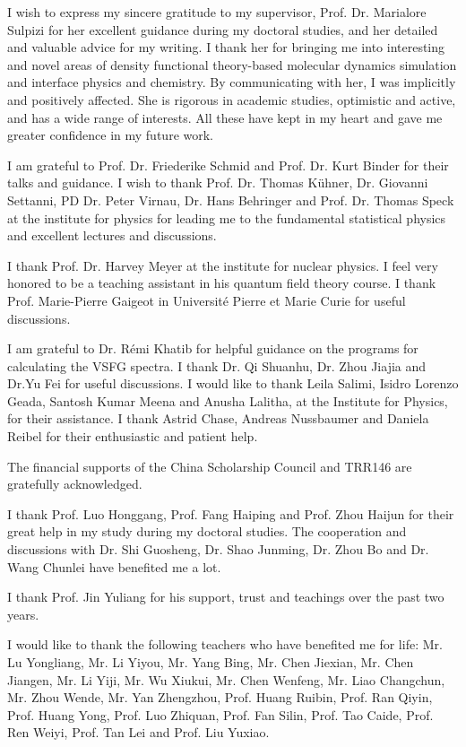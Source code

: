 \documentclass[
11pt, %
ngerman,
english, %
singlespacing, %
headsepline, %
]{MastersDoctoralThesis} %
\begin{document}
\begin{acknowledgements}
\addchaptertocentry{\acknowledgementname} %
I wish to express my sincere gratitude to my supervisor,
Prof. Dr. Marialore Sulpizi for her excellent guidance during my doctoral studies, and her detailed and valuable advice for my writing.
I thank her for bringing me into interesting and novel areas of density functional theory-based molecular dynamics simulation 
and interface physics and chemistry. By communicating with her, I was implicitly and positively affected. 
She is rigorous in academic studies, optimistic and active, and has a wide range of interests. 
All these have kept in my heart and gave me greater confidence in my future work.

%
I am grateful to Prof. Dr. Friederike Schmid  and Prof. Dr. Kurt Binder for their talks and guidance.
I wish to thank Prof. Dr. Thomas Kühner, Dr. Giovanni Settanni, PD Dr. Peter
Virnau, Dr. Hans Behringer and Prof. Dr. Thomas Speck at the institute for
physics for leading me to the fundamental statistical physics and excellent lectures and discussions. 

%
I thank Prof. Dr. Harvey Meyer at the institute for nuclear physics. 
I feel very honored to be a teaching assistant in his quantum field theory course. 
%
I thank Prof. Marie-Pierre Gaigeot in Universit{\'e} Pierre et Marie Curie for useful discussions.

%
I am grateful to Dr. R\'emi Khatib for helpful guidance on the programs for calculating the VSFG spectra. 
I thank Dr. Qi Shuanhu, Dr. Zhou Jiajia and Dr.Yu Fei for useful discussions. 
I would like to thank Leila Salimi, Isidro Lorenzo Geada, Santosh Kumar Meena and Anusha Lalitha, 
at the Institute for Physics, for their assistance.
%
I thank Astrid Chase, Andreas Nussbaumer and Daniela Reibel for their enthusiastic and patient help.

%
The financial supports of the China Scholarship Council and TRR146 are gratefully acknowledged.

%
I thank Prof. Luo Honggang, Prof. Fang Haiping and Prof. Zhou Haijun for their great help in my study during my doctoral studies. 
The cooperation and discussions with Dr. Shi Guosheng, Dr. Shao Junming, Dr. Zhou Bo and Dr. Wang Chunlei have benefited me a lot. 

%
I thank Prof. Jin Yuliang for his support, trust and teachings over the past two years.

%
I would like to thank the following teachers who have benefited me for life:
Mr. Lu Yongliang, Mr. Li Yiyou, 
Mr. Yang Bing, Mr. Chen Jiexian, Mr. Chen Jiangen, Mr. Li Yiji,
Mr. Wu Xiukui, Mr. Chen Wenfeng, Mr. Liao Changchun, Mr. Zhou Wende,
Mr. Yan Zhengzhou, Prof. Huang Ruibin, Prof. Ran Qiyin, Prof. Huang Yong, Prof. Luo Zhiquan, Prof. Fan Silin, Prof. Tao Caide, Prof. Ren Weiyi, 
Prof. Tan Lei and Prof. Liu Yuxiao.


\end{acknowledgements}
\end{document}
